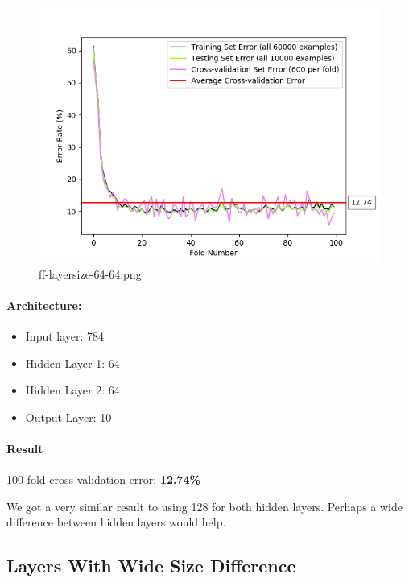 \documentclass[11pt]{article}
\makeatletter
\def\maxwidth{\ifdim\Gin@nat@width>\linewidth\linewidth
    \else\Gin@nat@width\fi}
\let\Oldincludegraphics\includegraphics
\renewcommand{\includegraphics}[1]{\Oldincludegraphics[width=.8\maxwidth]{#1}}
\providecommand{\tightlist}{%
      \setlength{\itemsep}{0pt}\setlength{\parskip}{0pt}}
\makeatother
\begin{document}
\begin{figure}[htbp]
\centering
\includegraphics{plots/ff-layersize-64-64.png}
\caption{ff-layersize-64-64.png}
\end{figure}

\paragraph{Architecture:}\label{architecture-5}

\begin{itemize}
\tightlist
\item
  Input layer: 784
\item
  Hidden Layer 1: 64
\item
  Hidden Layer 2: 64
\item
  Output Layer: 10
\end{itemize}

\paragraph{Result}\label{result-5}

100-fold cross validation error: \textbf{12.74\%}

We got a very similar result to using 128 for both hidden layers.
Perhaps a wide difference between hidden layers would help.

\pagebreak

\subsection{Layers With Wide Size
Difference}\label{layers-with-wide-size-difference}
\end{document}
